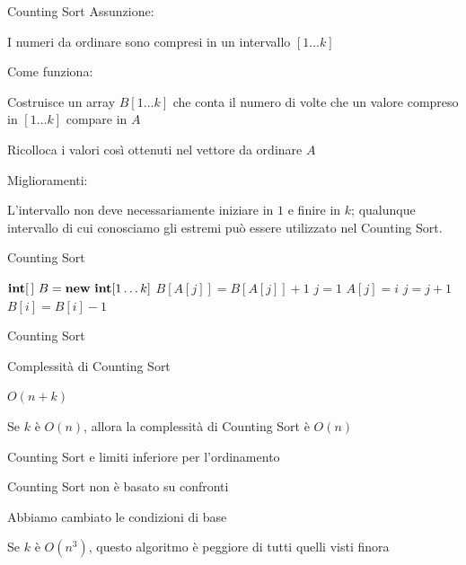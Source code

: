 \begin{frame}{Counting Sort}
Assunzione:
\BI
\item I numeri da ordinare sono compresi in un intervallo $[1 \ldots k]$
\EI

\bigskip
Come funziona:
\BI
\item  Costruisce un array $B[1 \ldots k]$ che conta il numero di volte che un valore compreso in $[1 \ldots k]$ compare in $A$
\item Ricolloca i valori così ottenuti nel vettore da ordinare  $A$	
\EI

\bigskip
Miglioramenti:
\BI
\item L'intervallo non deve necessariamente iniziare in $1$ e finire in $k$; qualunque intervallo di cui conosciamo gli estremi può essere utilizzato
nel Counting Sort.
\EI
\end{frame}%


\begin{frame}{Counting Sort}

\begin{Procedure}
\caption[A]{\countingsort($\INTEGER[\,]\ A,\ \INTEGER\ n,\ \INTEGER\ k$)}
$\INTEGER[\,]\ B = \NEW\ \INTEGER[1 \mldots k]$\;
{
  $B[A[j]] = B[A[j]]+1$\;
}
$j = 1$\;
{
  {
    $A[j] = i$\;
    $j = j+1$\;
    $B[i] = B[i]-1$\;
  }
}
\end{Procedure}


\end{frame}%

\begin{frame}{Counting Sort}
	
\begin{block}{Complessità di Counting Sort}
\BI
\item $O(n+k)$
\item Se $k$ è $O(n)$, allora la complessità di Counting Sort è $O(n)$
\EI
\end{block}

\bigskip
\begin{block}{Counting Sort e limiti inferiore per l'ordinamento}
\BI
\item Counting Sort non è basato su confronti
\item Abbiamo cambiato le condizioni di base 
\item Se $k$ è $O(n^3)$, questo algoritmo è peggiore di tutti quelli visti finora	
\EI
\end{block}
\end{frame}%

